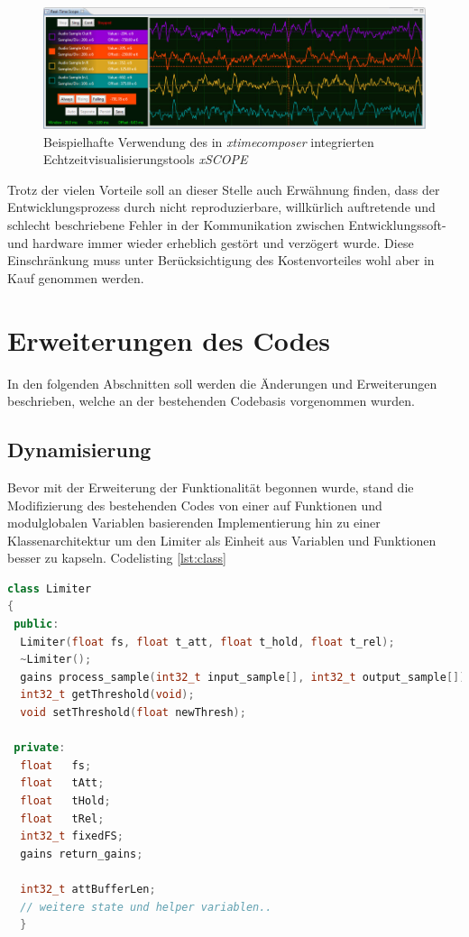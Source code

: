 \documentclass[paper=a4, fontsize=12pt]{scrartcl}
\numberwithin{equation}{section}		%
\numberwithin{figure}{section}			%
\numberwithin{table}{section}				%
\begin{document}
\begin{figure}[htb]
  \centering
  \label{fig:xscope}
  \includegraphics[width=01.0\textwidth]{graphics/xscope.jpg}
  \caption{Beispielhafte Verwendung des in \textit{xtimecomposer} integrierten Echtzeitvisualisierungstools \textit{xSCOPE}}
\end{figure}

Trotz der vielen Vorteile soll an dieser Stelle auch Erwähnung finden, dass der Entwicklungsprozess durch nicht reproduzierbare, willkürlich auftretende und schlecht beschriebene Fehler in der Kommunikation zwischen Entwicklungssoft- und hardware immer wieder erheblich gestört und verzögert wurde. Diese Einschränkung muss unter Berücksichtigung des Kostenvorteiles wohl aber in Kauf genommen werden.

\section{Erweiterungen des Codes}
In den folgenden Abschnitten soll werden die Änderungen und Erweiterungen beschrieben, welche an der bestehenden Codebasis vorgenommen wurden. 

\subsection{Dynamisierung}
Bevor mit der Erweiterung der Funktionalität begonnen wurde, stand die Modifizierung des bestehenden Codes von einer auf Funktionen und modulglobalen Variablen basierenden Implementierung hin zu einer Klassenarchitektur um den Limiter als Einheit aus Variablen und Funktionen besser zu kapseln. Codelisting \ref{lst:class}

\begin{lstlisting}[language=C++, label=lst:class, caption={}]
class Limiter
{
 public:
  Limiter(float fs, float t_att, float t_hold, float t_rel);
  ~Limiter();
  gains process_sample(int32_t input_sample[], int32_t output_sample[]);
  int32_t getThreshold(void);
  void setThreshold(float newThresh);

 private:
  float   fs;
  float   tAtt;
  float   tHold;
  float   tRel;
  int32_t fixedFS;
  gains return_gains;

  int32_t attBufferLen;
  // weitere state und helper variablen..
  }

\end{lstlisting}
\end{document}
